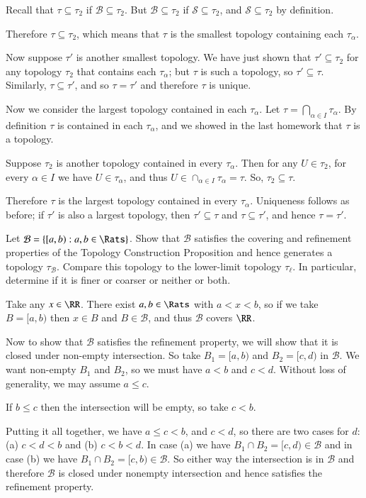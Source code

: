 \documentclass{homework}
\newcommand{\calB}{\mathcal{B}}
\newcommand{\calS}{\mathcal{S}}
\begin{document}
Recall that $\tau\subseteq\tau_2$ if $\calB\subseteq\tau_2$.  But
$\calB\subseteq\tau_2$ if $\calS\subseteq\tau_2$, and $\calS\subseteq\tau_2$
by definition.

Therefore $\tau\subseteq\tau_2$, which means that $\tau$ is the smallest
topology containing each $\tau_\alpha$.

Now suppose $\tau'$ is another smallest topology.  We have just shown
that $\tau'\subseteq\tau_2$ for any topology $\tau_2$ that contains each
$\tau_\alpha$; but $\tau$ is such a topology, so $\tau'\subseteq\tau$.
Similarly, $\tau\subseteq\tau'$, and so $\tau=\tau'$ and therefore $\tau$ is
unique.

Now we consider the largest topology contained in each $\tau_\alpha$.
Let $\tau=\bigcap_{\alpha\in I}\tau_\alpha$.  By definition $\tau$ is contained
in each $\tau_\alpha$, and we showed in the last homework that $\tau$
is a topology.

Suppose $\tau_2$ is another topology contained in every $\tau_\alpha$. Then
for any $U\in\tau_2$, for every $\alpha\in I$ we have $U\in\tau_\alpha$, and
thus $U\in\cap_{\alpha\in I}\tau_\alpha=\tau$.  So, $\tau_2\subseteq\tau$.

Therefore $\tau$ is the largest topology contained in every $\tau_\alpha$.
Uniqueness follows as before; if $\tau'$ is also a largest topology, then
$\tau'\subseteq\tau$ and $\tau\subseteq\tau'$, and hence $\tau=\tau'$.

\hrulefill
\begin{exercise}{3}
Let $\calB=\{[a,b):a,b\in \Rats\}$.  Show that $\calB$ satisfies
the covering and refinement properties of the Topology Construction Proposition
and hence generates a topology $\tau_\calB$.  Compare this topology to the
lower-limit topology $\tau_\ell$.  In particular, determine if it is finer or coarser
or neither or both.
\end{exercise}
\solution
Take any $x\in\RR$.  There exist $a,b\in\Rats$ with
$a<x<b$, so if we take $B=[a,b)$ then $x\in B$ and $B\in\calB$,
and thus $\calB$ covers $\RR$.

Now to show that $\calB$ satisfies the refinement property, we will
show that it is closed under non-empty intersection.  So take
$B_1=[a,b)$ and $B_2=[c,d)$ in $\calB$.  We want non-empty $B_1$
and $B_2$, so we must have $a<b$ and $c<d$.  Without loss of
generality, we may assume $a \le c$.

If $b\le c$ then the intersection will be empty, so take $c<b$.

Putting it all together, we have $a\le c<b$, and $c<d$, so there are two
cases for $d$: (a) $c<d<b$ and (b) $c<b<d$.  In case (a) we have
$B_1\cap B_2=[c,d) \in\calB$ and in case (b) we have
$B_1\cap B_2=[c,b) \in\calB$.  So either way the intersection is
in $\calB$ and therefore $\calB$ is closed under nonempty
intersection and hence satisfies the refinement property.
\end{document}
